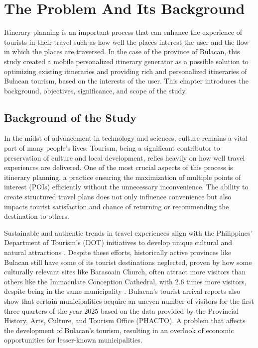\chapter{The Problem And Its Background}
\thispagestyle{empty}
Itinerary planning is an important process that can enhance the experience of tourists in their travel such as how well the places interest the user and the flow in which the places are traversed. In the case of the province of Bulacan, this study created a mobile personalized itinerary generator as a possible solution to optimizing existing itineraries and providing rich and personalized itineraries of Bulacan tourism, based on the interests of the user. This chapter introduces the background, objectives, significance, and scope of the study.

\section{Background of the Study}

In the midst of advancement in technology and sciences, culture remains a vital part of many people’s lives. Tourism, being a significant contributor to preservation of culture and local development, relies heavily on how well travel experiences are delivered. One of the most crucial aspects of this process is itinerary planning, a practice ensuring the maximization of multiple points of interest (POIs) efficiently without the unnecessary inconvenience. The ability to create structured travel plans does not only influence convenience but also impacts tourist satisfaction and chance of returning or recommending the destination to others.

Sustainable and authentic trends in travel experiences align with the Philippines’ Department of Tourism’s (DOT) initiatives to develop unique cultural and natural attractions \parencite{DOT2023}. Despite these efforts, historically active provinces like Bulacan still have some of its tourist destinations neglected, proven by how some culturally relevant sites like Barasoain Church, often attract more visitors than others like the Immaculate Conception Cathedral, with 2.6 times more visitors, despite being in the same municipality \parencite{Canet2025S}. Bulacan’s tourist arrival reports also show that certain municipalities acquire an uneven number of visitors for the first three quarters of the year 2025 based on the data provided by the  Provincial History, Arts, Culture, and Tourism Office (PHACTO). A problem that affects the development of Bulacan’s tourism, resulting in an overlook of economic opportunities for lesser-known municipalities.

